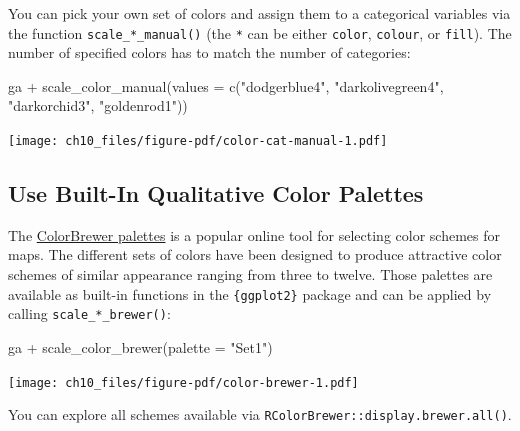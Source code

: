 \documentclass[
  letterpaper,
]{scrbook}
\newenvironment{Shaded}{\begin{snugshade}}{\end{snugshade}}
\newcommand{\AttributeTok}[1]{\textcolor[rgb]{0.40,0.45,0.13}{#1}}
\newcommand{\FunctionTok}[1]{\textcolor[rgb]{0.28,0.35,0.67}{#1}}
\newcommand{\NormalTok}[1]{\textcolor[rgb]{0.00,0.23,0.31}{#1}}
\newcommand{\SpecialCharTok}[1]{\textcolor[rgb]{0.37,0.37,0.37}{#1}}
\newcommand{\StringTok}[1]{\textcolor[rgb]{0.13,0.47,0.30}{#1}}
\begin{document}
You can pick your own set of colors and assign them to a categorical
variables via the function \texttt{scale\_*\_manual()} (the \texttt{*}
can be either \texttt{color}, \texttt{colour}, or \texttt{fill}). The
number of specified colors has to match the number of categories:

\begin{Shaded}
\begin{Highlighting}[]
\NormalTok{ga }\SpecialCharTok{+} \FunctionTok{scale\_color\_manual}\NormalTok{(}\AttributeTok{values =} \FunctionTok{c}\NormalTok{(}\StringTok{"dodgerblue4"}\NormalTok{,}
                                   \StringTok{"darkolivegreen4"}\NormalTok{,}
                                   \StringTok{"darkorchid3"}\NormalTok{,}
                                   \StringTok{"goldenrod1"}\NormalTok{))}
\end{Highlighting}
\end{Shaded}

\texttt{[image: ch10\_files/figure-pdf/color-cat-manual-1.pdf]}

\subsection{Use Built-In Qualitative Color
Palettes}\label{use-built-in-qualitative-color-palettes}

The \href{http://colorbrewer2.org/}{ColorBrewer palettes} is a popular
online tool for selecting color schemes for maps. The different sets of
colors have been designed to produce attractive color schemes of similar
appearance ranging from three to twelve. Those palettes are available as
built-in functions in the \texttt{\{ggplot2\}} package and can be
applied by calling \texttt{scale\_*\_brewer()}:

\begin{Shaded}
\begin{Highlighting}[]
\NormalTok{ga }\SpecialCharTok{+} \FunctionTok{scale\_color\_brewer}\NormalTok{(}\AttributeTok{palette =} \StringTok{"Set1"}\NormalTok{)}
\end{Highlighting}
\end{Shaded}

\texttt{[image: ch10\_files/figure-pdf/color-brewer-1.pdf]}

\begin{tcolorbox}[enhanced jigsaw, toprule=.15mm, bottomtitle=1mm, coltitle=black, breakable, colbacktitle=quarto-callout-note-color!10!white, opacityback=0, toptitle=1mm, colframe=quarto-callout-note-color-frame, titlerule=0mm, title=\textcolor{quarto-callout-note-color}{\faInfo}\hspace{0.5em}{Note}, bottomrule=.15mm, arc=.35mm, opacitybacktitle=0.6, leftrule=.75mm, left=2mm, rightrule=.15mm, colback=white]

You can explore all schemes available via
\texttt{RColorBrewer::display.brewer.all()}.

\end{tcolorbox}
\end{document}
